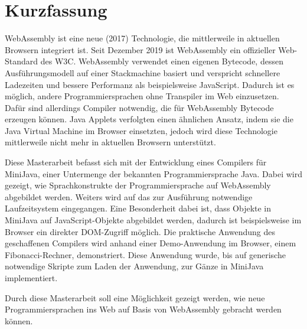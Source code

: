 \chapter{Kurzfassung}

WebAssembly ist eine neue (2017) Technologie, die mittlerweile in aktuellen Browsern integriert ist. Seit Dezember 2019 ist WebAssembly ein offizieller Web-Standard des W3C. WebAssembly verwendet einen eigenen Bytecode, dessen Ausführungsmodell auf einer Stackmachine basiert und verspricht schnellere Ladezeiten und bessere Performanz als beispielsweise JavaScript. Dadurch ist es möglich, andere Programmiersprachen ohne Transpiler im Web einzusetzen. Dafür sind allerdings Compiler notwendig, die für WebAssembly Bytecode erzeugen können. Java Applets verfolgten einen ähnlichen Ansatz, indem sie die Java Virtual Machine im Browser einsetzten, jedoch wird diese Technologie mittlerweile nicht mehr in aktuellen Browsern unterstützt.

Diese Masterarbeit befasst sich mit der Entwicklung eines Compilers für MiniJava, einer Untermenge der bekannten Programmiersprache Java. Dabei wird gezeigt, wie Sprachkonstrukte der Programmiersprache auf WebAssembly abgebildet werden. Weiters wird auf das zur Ausführung notwendige Laufzeitsystem eingegangen. Eine Besonderheit dabei ist, dass Objekte in MiniJava auf JavaScript-Objekte abgebildet werden, dadurch ist beispielsweise im Browser ein direkter DOM-Zugriff möglich. Die praktische Anwendung des geschaffenen Compilers wird anhand einer Demo-Anwendung im Browser, einem Fibonacci-Rechner, demonstriert. Diese Anwendung wurde, bis auf generische notwendige Skripte zum Laden der Anwendung, zur Gänze in MiniJava implementiert.

Durch diese Masterarbeit soll eine Möglichkeit gezeigt werden, wie neue Programmiersprachen ins Web auf Basis von WebAssembly gebracht werden können.
